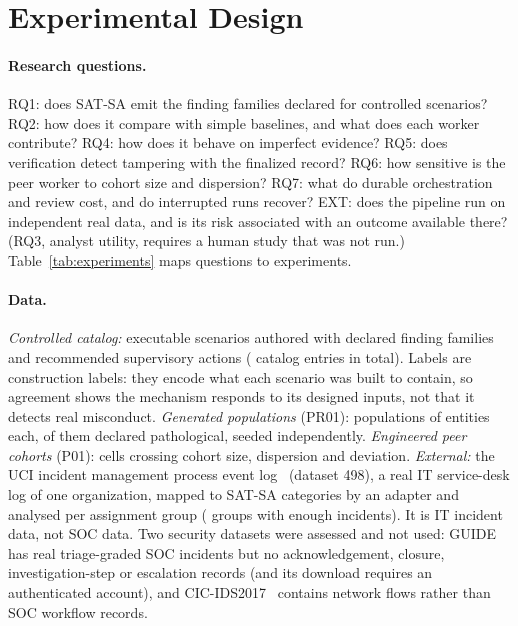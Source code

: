 \section{Experimental Design}
\label{sec:design}

\paragraph{Research questions.}
RQ1: does SAT-SA emit the finding families declared for controlled scenarios?
RQ2: how does it compare with simple baselines, and what does each worker
contribute? RQ4: how does it behave on imperfect evidence? RQ5: does verification
detect tampering with the finalized record? RQ6: how sensitive is the peer worker
to cohort size and dispersion? RQ7: what do durable orchestration and review cost,
and do interrupted runs recover? EXT: does the pipeline run on independent real
data, and is its risk associated with an outcome available there? (RQ3, analyst
utility, requires a human study that was not run.) Table~\ref{tab:experiments}
maps questions to experiments.


\paragraph{Data.}
\emph{Controlled catalog:}  executable scenarios authored
with declared finding families and recommended supervisory actions
( catalog entries in total). Labels are construction labels:
they encode what each scenario was built to contain, so agreement shows the
mechanism responds to its designed inputs, not that it detects real misconduct.
\emph{Generated populations} (PR01):  populations of
 entities each,  of them declared
pathological, seeded independently. \emph{Engineered peer cohorts} (P01):
 cells crossing cohort size, dispersion and deviation.
\emph{External:} the UCI incident management process event log~\cite{amaral2018uci498}
(dataset 498), a real IT service-desk log of one organization, mapped to SAT-SA
categories by an adapter and analysed per assignment group
( groups with enough incidents). It is IT incident data, not SOC
data. Two security datasets were assessed and not used: GUIDE~\cite{freitas2024guide}
has real triage-graded SOC incidents but no acknowledgement, closure,
investigation-step or escalation records (and its download requires an
authenticated account), and CIC-IDS2017~\cite{sharafaldin2018cicids} contains
network flows rather than SOC workflow records.

